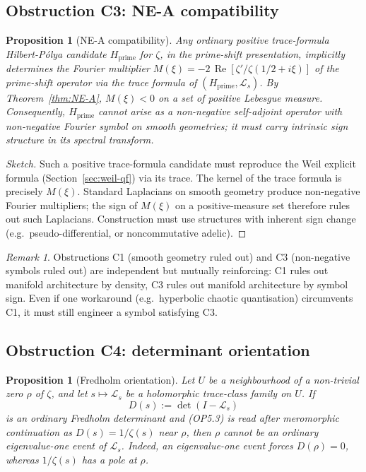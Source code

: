 \documentclass[11pt]{article}
\newtheorem{proposition}[theorem]{Proposition}
\theoremstyle{definition}
\theoremstyle{remark}
\newtheorem{remark}[theorem]{Remark}
\renewcommand{\Re}{\operatorname{Re}}
\begin{document}
\subsection{Obstruction C3: NE-A compatibility}
\label{sec:obs-C3}

\begin{proposition}[NE-A compatibility]\label{prop:ne-a-compat}
Any ordinary positive trace-formula Hilbert-P\'olya candidate
$H_\mathrm{prime}$ for $\zeta$, in the prime-shift presentation,
implicitly determines the Fourier multiplier
$M(\xi) = -2\,\Re[\zeta'/\zeta(1/2 + i\xi)]$ of the prime-shift
operator via the trace formula of $(H_\mathrm{prime}, \mathcal{L}_s)$.
By Theorem~\ref{thm:NE-A}, $M(\xi) < 0$ on a set of positive
Lebesgue measure. Consequently, $H_\mathrm{prime}$ cannot arise as
a non-negative self-adjoint operator with non-negative Fourier
symbol on smooth geometries; it must carry intrinsic sign structure
in its spectral transform.
\end{proposition}

\begin{proof}[Sketch]
Such a positive trace-formula candidate must reproduce the Weil explicit
formula (Section~\ref{sec:weil-qf}) via its trace. The kernel of the trace
formula is precisely $M(\xi)$. Standard Laplacians on smooth geometry
produce non-negative Fourier multipliers; the sign of $M(\xi)$ on a
positive-measure set therefore rules out such Laplacians.
Construction must use structures with inherent sign change (e.g.\
pseudo-differential, or noncommutative adelic).
\end{proof}

\begin{remark}\label{rem:ne-a-connection}
Obstructions C1 (smooth geometry ruled out) and C3 (non-negative
symbols ruled out) are independent but mutually reinforcing: C1
rules out manifold architecture by density, C3 rules out manifold
architecture by symbol sign. Even if one workaround (e.g.\
hyperbolic chaotic quantisation) circumvents C1, it must still
engineer a symbol satisfying C3.
\end{remark}

\subsection{Obstruction C4: determinant orientation}
\label{sec:obs-C4}

\begin{proposition}[Fredholm orientation]\label{prop:fredholm-orientation}
Let $U$ be a neighbourhood of a non-trivial zero $\rho$ of $\zeta$,
and let $s\mapsto\mathcal{L}_s$ be a holomorphic trace-class family on
$U$. If
\[
  D(s) := \det(I-\mathcal{L}_s)
\]
is an ordinary Fredholm determinant and (OP5.3) is read after
meromorphic continuation as $D(s)=1/\zeta(s)$ near $\rho$, then
$\rho$ cannot be an ordinary eigenvalue-one event of $\mathcal{L}_s$.
Indeed, an eigenvalue-one event forces $D(\rho)=0$, whereas
$1/\zeta(s)$ has a pole at $\rho$.
\end{proposition}
\end{document}
